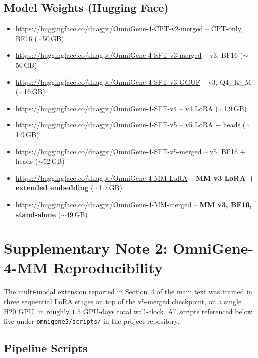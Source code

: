 \documentclass[11pt]{article}
\begin{document}
\subsection{Model Weights (Hugging Face)}

\begin{itemize}
\item \url{https://huggingface.co/dnagpt/OmniGene-4-CPT-v2-merged} -- CPT-only, BF16 ($\sim$50\,GB)
\item \url{https://huggingface.co/dnagpt/OmniGene-4-SFT-v3-merged} -- v3, BF16 ($\sim$50\,GB)
\item \url{https://huggingface.co/dnagpt/OmniGene-4-SFT-v3-GGUF} -- v3, Q4\_K\_M ($\sim$16\,GB)
\item \url{https://huggingface.co/dnagpt/OmniGene-4-SFT-v4} -- v4 LoRA ($\sim$1.9\,GB)
\item \url{https://huggingface.co/dnagpt/OmniGene-4-SFT-v5} -- v5 LoRA + heads ($\sim$1.9\,GB)
\item \url{https://huggingface.co/dnagpt/OmniGene-4-SFT-v5-merged} -- v5, BF16 + heads ($\sim$52\,GB)
\item \url{https://huggingface.co/dnagpt/OmniGene-4-MM-LoRA} -- \textbf{MM v3 LoRA + extended embedding} ($\sim$1.7\,GB)
\item \url{https://huggingface.co/dnagpt/OmniGene-4-MM-merged} -- \textbf{MM v3, BF16, stand-alone} ($\sim$49\,GB)
\end{itemize}


\section{Supplementary Note 2: OmniGene-4-MM Reproducibility}

The multi-modal extension reported in Section~4 of the main text was trained
in three sequential LoRA stages on top of the v5-merged checkpoint, on a
single H20 GPU, in roughly $1.5$ GPU-days total wall-clock. All scripts
referenced below live under \texttt{omnigene5/scripts/} in the project
repository.

\subsection{Pipeline Scripts}
\end{document}
